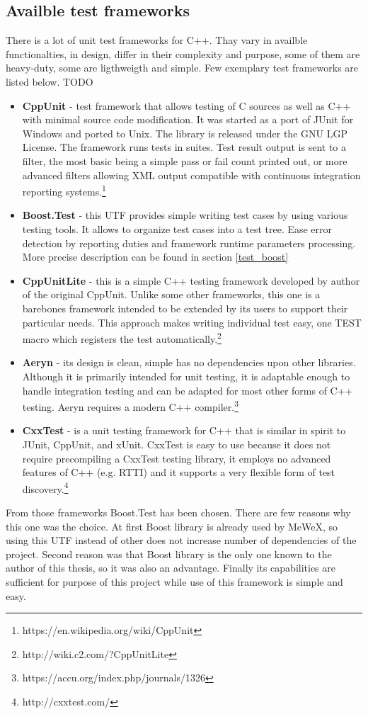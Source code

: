 \subsection{Availble test frameworks}
There is a lot of unit test frameworks for C++. Thay vary in availble functionalties, in design, differ in their complexity and purpose, 
some of them are heavy-duty, some are ligthweigth and simple. Few exemplary test frameworks are listed below.
TODO
\begin{itemize}
    \item \textbf{CppUnit} - test framework that allows testing of C sources as well as C++ with minimal source code modification.
            It was started as a port of JUnit for Windows and ported to Unix. The library is released under the GNU LGP License.
            The framework runs tests in suites. Test result output is sent to a filter, the most basic being a simple pass or fail count printed out, 
            or more advanced filters allowing XML output compatible with continuous integration reporting systems.\footnote{https://en.wikipedia.org/wiki/CppUnit}
    \item \textbf{Boost.Test} - this UTF provides simple writing test cases by using various testing tools. 
            It allows to organize test cases into a test tree. Ease error detection by reporting duties and framework runtime parameters processing.
            More precise description can be found in section \ref{test_boost}
    \item \textbf{CppUnitLite} - this is a simple C++ testing framework developed by author of the original CppUnit. 
            Unlike some other frameworks, this one is a barebones framework intended to be extended by its users to support their particular needs.
            This approach makes writing individual test easy, one TEST macro which registers the test automatically.\footnote{http://wiki.c2.com/?CppUnitLite}
    \item \textbf{Aeryn} - its design is clean, simple has no dependencies upon other libraries. Although it is primarily intended for unit testing, 
            it is adaptable enough to handle integration testing and can be adapted for most other forms of C++ testing.
            Aeryn requires a modern C++ compiler.\footnote{https://accu.org/index.php/journals/1326}
    \item \textbf{CxxTest} - is a unit testing framework for C++ that is similar in spirit to JUnit, CppUnit, and xUnit. 
            CxxTest is easy to use because it does not require precompiling a CxxTest testing library, 
            it employs no advanced features of C++ (e.g. RTTI) and it supports a very flexible form of test discovery.\footnote{http://cxxtest.com/}
\end{itemize}
From those frameworks Boost.Test has been chosen. There are few reasons why this one was the choice. 
At first Boost library is already used by MeWeX, so using this UTF instead of other does not increase number of dependencies of the project. 
Second reason was that Boost library is the only one known to the author of this thesis, so it was also an advantage. 
Finally its capabilities are sufficient for purpose of this project while use of this framework is simple and easy.


